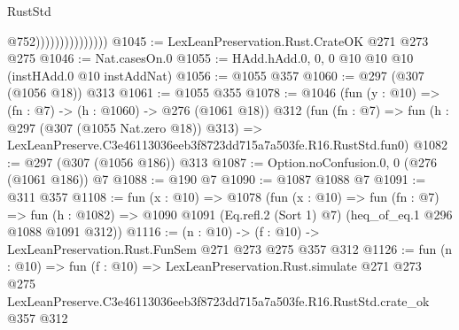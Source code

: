 \begin{lexlean}{RustStd}
\begin{coremodule}
                                  @752)))))))))))))))
@1045 := LexLeanPreservation.Rust.CrateOK @271 @273 @275
@1046 := Nat.casesOn.{0}
@1055 := HAdd.hAdd.{0, 0, 0} @10 @10 @10 (instHAdd.{0} @10 instAddNat)
@1056 := @1055 @357
@1060 := @297 (@307 (@1056 @18)) @313
@1061 := @1055 @355
@1078 := @1046
    (fun (y : @10) => (fn : @7) -> (h : @1060) -> @276 (@1061 @18))
    @312
    (fun (fn : @7) =>
    fun (h : @297 (@307 (@1055 Nat.zero @18)) @313) =>
    LexLeanPreserve.C3e46113036eeb3f8723dd715a7a503fe.R16.RustStd.fun0)
@1082 := @297 (@307 (@1056 @186)) @313
@1087 := Option.noConfusion.{0, 0} (@276 (@1061 @186)) @7
@1088 := @190 @7
@1090 := @1087 @1088 @7
@1091 := @311 @357
@1108 := fun (x : @10) =>
  @1078
    (fun (x : @10) =>
    fun (fn : @7) =>
    fun (h : @1082) => @1090 @1091 (Eq.refl.{2} (Sort 1) @7) (heq_of_eq.{1} @296 @1088 @1091 @312))
@1116 := (n : @10) -> (f : @10) -> LexLeanPreservation.Rust.FunSem @271 @273 @275 @357 @312
@1126 := fun (n : @10) =>
  fun (f : @10) =>
  LexLeanPreservation.Rust.simulate
    @271
    @273
    @275
    LexLeanPreserve.C3e46113036eeb3f8723dd715a7a503fe.R16.RustStd.crate_ok
    @357
    @312
\end{coremodule}
\end{lexlean}

